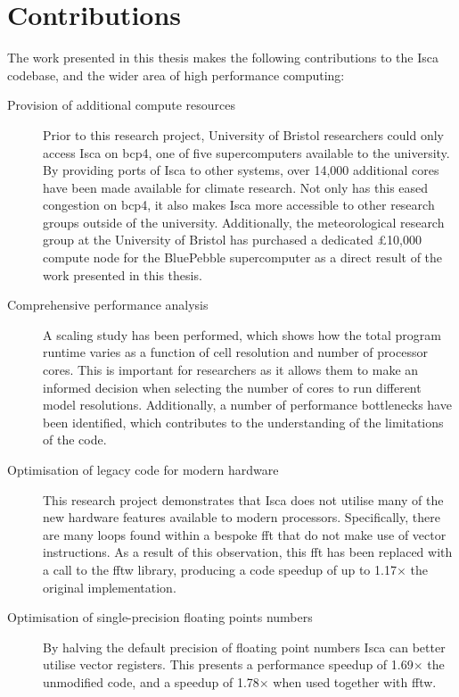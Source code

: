 \documentclass[a4paper,11pt]{report}
\begin{document}
\section{Contributions}
The work presented in this thesis makes the following contributions to the Isca codebase, and the wider area of high performance computing:
\begin{description}
	\item[Provision of additional compute resources] Prior to this research project, University of Bristol researchers could only access Isca on \gls{bcp4}, one of five supercomputers available to the university. By providing ports of Isca to other systems, over 14,000 additional cores have been made available for climate research. Not only has this eased congestion on \gls{bcp4}, it also makes Isca more accessible to other research groups outside of the university. Additionally, the meteorological research group at the University of Bristol has purchased a dedicated £10,000 compute node for the BluePebble supercomputer as a direct result of the work presented in this thesis. 

	\item[Comprehensive performance analysis] A scaling study has been performed, which shows how the total program runtime varies as a function of cell resolution and number of processor cores. This is important for researchers as it allows them to make an informed decision when selecting the number of cores to run different model resolutions. Additionally, a number of performance bottlenecks have been identified, which contributes to the understanding of the limitations of the code. 
	
	\item[Optimisation of legacy code for modern hardware] This research project demonstrates that Isca does not utilise many of the new hardware features available to modern processors. Specifically, there are many loops found within a bespoke \gls{fft} that do not make use of vector instructions. As a result of this observation, this \gls{fft} has been replaced with a call to the \gls{fftw} library, producing a code speedup of up to 1.17$\times$ the original implementation.
	
	\item[Optimisation of single-precision floating points numbers] By halving the default precision of floating point numbers Isca can better utilise vector registers. This presents a performance speedup of 1.69$\times$ the unmodified code, and a speedup of 1.78$\times$ when used together with \gls{fftw}. 
	

\end{description}
\end{document}
